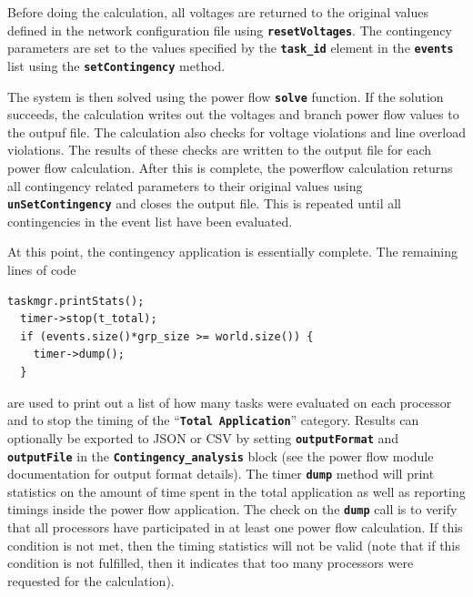 Before doing the calculation, all voltages are returned to the original values defined in the network configuration file using \texttt{\textbf{resetVoltages}}. The contingency parameters are set to the values specified by the \texttt{\textbf{task\_id}} element in the \texttt{\textbf{events}} list using the \texttt{\textbf{setContingency}} method.

The system is then solved using the power flow \texttt{\textbf{solve}} function. If the solution succeeds, the calculation writes out the voltages and branch power flow values to the outpuf file. The calculation also checks for voltage violations and line overload violations. The results of these checks are written to the output file for each power flow calculation. After this is complete, the powerflow calculation returns all contingency related parameters to their original values using \texttt{\textbf{unSetContingency}} and closes the output file. This is repeated until all contingencies in the event list have been evaluated.

At this point, the contingency application is essentially complete. The remaining lines of code

{
\color{red}
\begin{Verbatim}[fontseries=b]
  taskmgr.printStats();
  timer->stop(t_total);
  if (events.size()*grp_size >= world.size()) {
    timer->dump();
  }
\end{Verbatim}
}

are used to print out a list of how many tasks were evaluated on each processor and to stop the timing of the ``\texttt{\textbf{Total Application}}'' category. Results can optionally be exported to JSON or CSV by setting \texttt{\textbf{outputFormat}} and \texttt{\textbf{outputFile}} in the \texttt{\textbf{Contingency\_analysis}} block (see the power flow module documentation for output format details). The timer \texttt{\textbf{dump}} method will print statistics on the amount of time spent in the total application as well as reporting timings inside the power flow application. The check on the \texttt{\textbf{dump}} call is to verify that all processors have participated in at least one power flow calculation.
If this condition is not met, then the timing statistics will not be valid (note
that if this condition is not fulfilled, then it indicates that too many
processors were requested for the calculation).
\newline
\hyperlink{topDoc}{\color{blue}{Top}}
